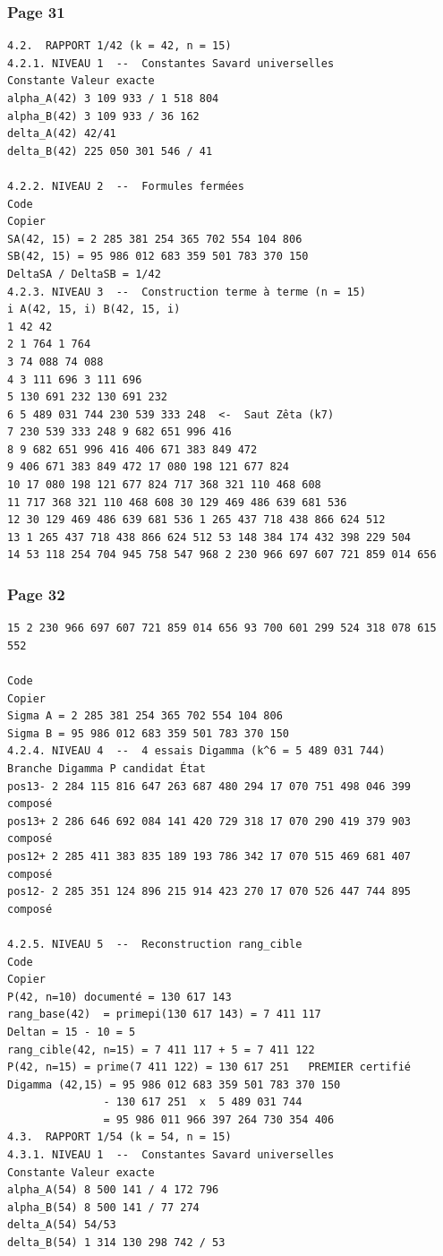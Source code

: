 \documentclass[11pt,a4paper]{article}
\begin{document}
\subsubsection*{Page 31}
\begin{Verbatim}[fontsize=\footnotesize]
4.2.  RAPPORT 1/42 (k = 42, n = 15) 
4.2.1. NIVEAU 1  --  Constantes Savard universelles 
Constante Valeur exacte 
alpha_A(42) 3 109 933 / 1 518 804 
alpha_B(42) 3 109 933 / 36 162 
delta_A(42) 42/41 
delta_B(42) 225 050 301 546 / 41 
 
4.2.2. NIVEAU 2  --  Formules fermées 
Code 
Copier 
SA(42, 15) = 2 285 381 254 365 702 554 104 806 
SB(42, 15) = 95 986 012 683 359 501 783 370 150 
DeltaSA / DeltaSB = 1/42   
4.2.3. NIVEAU 3  --  Construction terme à terme (n = 15) 
i A(42, 15, i) B(42, 15, i) 
1 42 42 
2 1 764 1 764 
3 74 088 74 088 
4 3 111 696 3 111 696 
5 130 691 232 130 691 232 
6 5 489 031 744 230 539 333 248  <-  Saut Zêta (k7) 
7 230 539 333 248 9 682 651 996 416 
8 9 682 651 996 416 406 671 383 849 472 
9 406 671 383 849 472 17 080 198 121 677 824 
10 17 080 198 121 677 824 717 368 321 110 468 608 
11 717 368 321 110 468 608 30 129 469 486 639 681 536 
12 30 129 469 486 639 681 536 1 265 437 718 438 866 624 512 
13 1 265 437 718 438 866 624 512 53 148 384 174 432 398 229 504 
14 53 118 254 704 945 758 547 968 2 230 966 697 607 721 859 014 656 
\end{Verbatim}
\medskip
\subsubsection*{Page 32}
\begin{Verbatim}[fontsize=\footnotesize]
15 2 230 966 697 607 721 859 014 656 93 700 601 299 524 318 078 615 552 
 
Code 
Copier 
Sigma A = 2 285 381 254 365 702 554 104 806   
Sigma B = 95 986 012 683 359 501 783 370 150   
4.2.4. NIVEAU 4  --  4 essais Digamma (k^6 = 5 489 031 744) 
Branche Digamma P candidat État 
pos13- 2 284 115 816 647 263 687 480 294 17 070 751 498 046 399   composé 
pos13+ 2 286 646 692 084 141 420 729 318 17 070 290 419 379 903   composé 
pos12+ 2 285 411 383 835 189 193 786 342 17 070 515 469 681 407   composé 
pos12- 2 285 351 124 896 215 914 423 270 17 070 526 447 744 895   composé 
 
4.2.5. NIVEAU 5  --  Reconstruction rang_cible 
Code 
Copier 
P(42, n=10) documenté = 130 617 143 
rang_base(42)  = primepi(130 617 143) = 7 411 117 
Deltan = 15 - 10 = 5 
rang_cible(42, n=15) = 7 411 117 + 5 = 7 411 122 
P(42, n=15) = prime(7 411 122) = 130 617 251   PREMIER certifié 
Digamma (42,15) = 95 986 012 683 359 501 783 370 150 
               - 130 617 251  x  5 489 031 744 
               = 95 986 011 966 397 264 730 354 406 
4.3.  RAPPORT 1/54 (k = 54, n = 15) 
4.3.1. NIVEAU 1  --  Constantes Savard universelles 
Constante Valeur exacte 
alpha_A(54) 8 500 141 / 4 172 796 
alpha_B(54) 8 500 141 / 77 274 
delta_A(54) 54/53 
delta_B(54) 1 314 130 298 742 / 53 
\end{Verbatim}
\medskip
\end{document}
